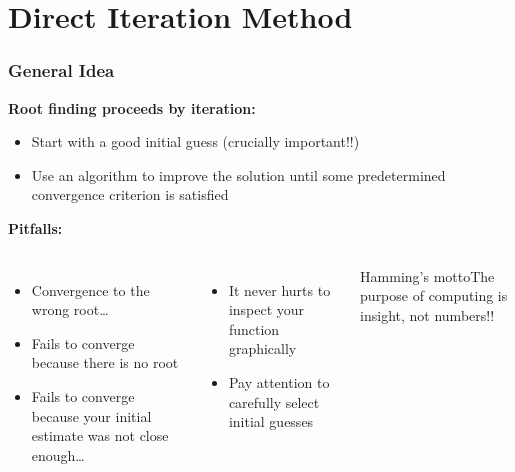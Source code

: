 \section{Direct Iteration Method}
  \begin{frame}[fragile]
    \frametitle{General Idea}
  
    \textbf{Root finding proceeds by iteration:}
    \begin{itemize}
      \item Start with a good initial guess (crucially important!!)
      \item Use an algorithm to improve the solution until some predetermined convergence criterion is satisfied
    \end{itemize}
  
    \textbf{Pitfalls:}
    \begin{columns}
      \begin{itemize}
        \item Convergence to the wrong root…
        \item Fails to converge because there is no root
        \item Fails to converge because your initial estimate was not close enough…
      \end{itemize}
  
      \begin{itemize}
        \item It never hurts to inspect your function graphically
        \item Pay attention to carefully select initial guesses
      \end{itemize}
        \begin{block}{Hamming’s motto}The purpose of computing is insight, not numbers!!\end{block}
      \end{columns}
  \end{frame}
  
